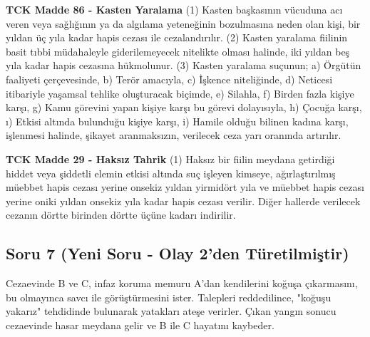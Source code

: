 \documentclass[a4paper, 11pt, twocolumn]{article}
\newenvironment{lawbox}{%
    \par\noindent
    \begin{tcolorbox}[
        colback=lawbg,
        colframe=boxcolor,
        fonttitle=\bfseries,
        boxrule=0.5pt,
        left=3pt,
        right=3pt,
        top=3pt,
        bottom=3pt,
        width=\columnwidth,
        arc=2pt,
        before skip=0.2cm,
        after skip=0.2cm
    ]
    \footnotesize\itshape
}{\end{tcolorbox}}
\begin{document}
\begin{lawbox}
\textbf{TCK Madde 86 - Kasten Yaralama}
\newline
(1) Kasten başkasının vücuduna acı veren veya sağlığının ya da algılama yeteneğinin bozulmasına neden olan kişi, bir yıldan üç yıla kadar hapis cezası ile cezalandırılır.
\newline
(2) Kasten yaralama fiilinin basit tıbbi müdahaleyle giderilemeyecek nitelikte olması halinde, iki yıldan beş yıla kadar hapis cezasına hükmolunur.
\newline
(3) Kasten yaralama suçunun;
a) Örgütün faaliyeti çerçevesinde,
b) Terör amacıyla,
c) İşkence niteliğinde,
d) Neticesi itibariyle yaşamsal tehlike oluşturacak biçimde,
e) Silahla,
f) Birden fazla kişiye karşı,
g) Kamu görevini yapan kişiye karşı bu görevi dolayısıyla,
h) Çocuğa karşı,
ı) Etkisi altında bulunduğu kişiye karşı,
i) Hamile olduğu bilinen kadına karşı,
işlenmesi halinde, şikayet aranmaksızın, verilecek ceza yarı oranında artırılır.
\end{lawbox}
\begin{lawbox}
\textbf{TCK Madde 29 - Haksız Tahrik}
\newline
(1) Haksız bir fiilin meydana getirdiği hiddet veya şiddetli elemin etkisi altında suç işleyen kimseye, ağırlaştırılmış müebbet hapis cezası yerine onsekiz yıldan yirmidört yıla ve müebbet hapis cezası yerine oniki yıldan onsekiz yıla kadar hapis cezası verilir. Diğer hallerde verilecek cezanın dörtte birinden dörtte üçüne kadarı indirilir.
\end{lawbox}

\newpage

\subsection*{Soru 7 (Yeni Soru - Olay 2'den Türetilmiştir)}
Cezaevinde B ve C, infaz koruma memuru A'dan kendilerini koğuşa çıkarmasını, bu olmayınca savcı ile görüştürmesini ister. Talepleri reddedilince, "koğuşu yakarız" tehdidinde bulunarak yatakları ateşe verirler. Çıkan yangın sonucu cezaevinde hasar meydana gelir ve B ile C hayatını kaybeder.
\end{document}
